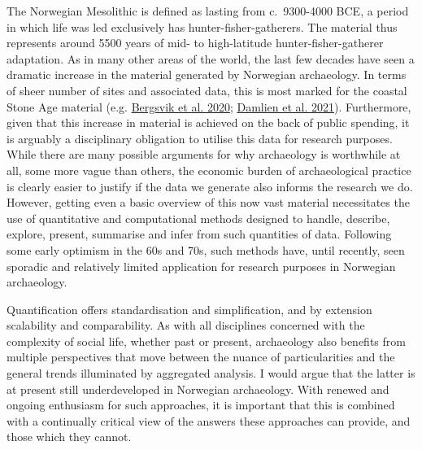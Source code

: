 \documentclass[
  12pt,
  a4paper,
  oneside]{book}
\begin{document}
The Norwegian Mesolithic is defined as lasting from c.~9300-4000 BCE, a period in which life was led exclusively has hunter-fisher-gatherers. The material thus represents around 5500 years of mid- to high-latitude hunter-fisher-gatherer adaptation. As in many other areas of the world, the last few decades have seen a dramatic increase in the material generated by Norwegian archaeology. In terms of sheer number of sites and associated data, this is most marked for the coastal Stone Age material (e.g. \protect\hyperlink{ref-bergsvik2020}{Bergsvik et al. 2020}; \protect\hyperlink{ref-damlien2021}{Damlien et al. 2021}). Furthermore, given that this increase in material is achieved on the back of public spending, it is arguably a disciplinary obligation to utilise this data for research purposes. While there are many possible arguments for why archaeology is worthwhile at all, some more vague than others, the economic burden of archaeological practice is clearly easier to justify if the data we generate also informs the research we do. However, getting even a basic overview of this now vast material necessitates the use of quantitative and computational methods designed to handle, describe, explore, present, summarise and infer from such quantities of data. Following some early optimism in the 60s and 70s, such methods have, until recently, seen sporadic and relatively limited application for research purposes in Norwegian archaeology.

Quantification offers standardisation and simplification, and by extension scalability and comparability. As with all disciplines concerned with the complexity of social life, whether past or present, archaeology also benefits from multiple perspectives that move between the nuance of particularities and the general trends illuminated by aggregated analysis. I would argue that the latter is at present still underdeveloped in Norwegian archaeology. With renewed and ongoing enthusiasm for such approaches, it is important that this is combined with a continually critical view of the answers these approaches can provide, and those which they cannot.
\end{document}
